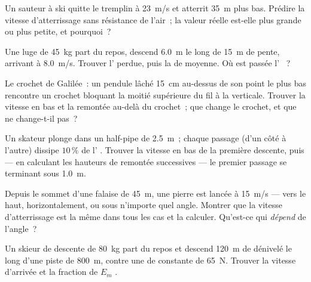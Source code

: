 \begin{exercise}[$\star\star$]\label{exo:g11:mechanical-energy:9}
Un sauteur à ski quitte le tremplin à \qty{23}{m/s} et atterrit
\qty{35}{m} plus bas. Prédire la vitesse d'atterrissage sans
résistance de l'air~; la valeur réelle est-elle plus grande ou plus
petite, et pourquoi~?
\end{exercise}

\begin{exercise}[$\star\star$]\label{exo:g11:mechanical-energy:10}
Une luge de \qty{45}{kg} part du repos, descend \qty{6.0}{m} le long
de \qty{15}{m} de pente, arrivant à \qty{8.0}{m/s}. Trouver l'
 perdue, puis la
 de
 moyenne. Où est passée l'
~?
\end{exercise}

\begin{exercise}[$\star\star$]\label{exo:g11:mechanical-energy:11}
Le crochet de Galilée~: un pendule lâché \qty{15}{cm} au-dessus de
son point le plus bas rencontre un crochet bloquant la moitié
supérieure du fil à la verticale. Trouver la vitesse en bas et la
remontée au-delà du crochet~; que change le crochet, et que ne
change-t-il pas~?
\end{exercise}

\begin{exercise}[$\star\star\star$]\label{exo:g11:mechanical-energy:12}
Un skateur plonge dans un half-pipe de \qty{2.5}{m}~; chaque passage
(d'un côté à l'autre) dissipe $10\,\%$ de l'
. Trouver la vitesse
en bas de la première descente, puis --- en calculant les hauteurs de
remontée successives --- le premier passage se terminant sous
\qty{1.0}{m}.
\end{exercise}

\begin{exercise}[$\star\star\star$]\label{exo:g11:mechanical-energy:13}
Depuis le sommet d'une falaise de \qty{45}{m}, une pierre est lancée à
\qty{15}{m/s} --- vers le haut, horizontalement, ou sous n'importe
quel angle. Montrer que la vitesse d'atterrissage est la même dans
tous les cas et la calculer. Qu'est-ce qui \emph{dépend} de l'angle~?
\end{exercise}

\begin{exercise}[$\star\star\star$]\label{exo:g11:mechanical-energy:14}
Un skieur de descente de \qty{80}{kg} part du repos et descend
\qty{120}{m} de dénivelé le long d'une piste de \qty{800}{m}, contre
une  de
 constante de \qty{65}{N}.
Trouver la vitesse d'arrivée et la fraction de $E_m$
.
\end{exercise}

